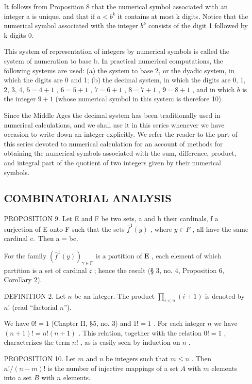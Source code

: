 It follows from Proposition 8 that the numerical symbol associated with an integer a is unique, and that if \(a < b^{k}\) it contains at most k digits. Notice that the numerical symbol associated with the integer \(b^{k}\) consists of the digit 1 followed by k digits 0.

This system of representation of integers by numerical symbols is called the system of numeration to base b. In practical numerical computations, the following systems are used: (a) the system to base 2, or the dyadic system, in which the digits are 0 and 1; (b) the decimal system, in which the digits are 0, 1, 2, 3, 4, \(5 = 4 + 1\) , \(6 = 5 + 1\) , \(7 = 6 + 1\) , \(8 = 7 + 1\) , \(9 = 8 + 1\) , and in which \(b\) is the integer \(9 + 1\) (whose numerical symbol in this system is therefore 10).

Since the Middle Ages the decimal system has been traditionally used in numerical calculations, and we shall use it in this series whenever we have occasion to write down an integer explicitly. We refer the reader to the part of this series devoted to numerical calculation for an account of methods for obtaining the numerical symbols associated with the sum, difference, product, and integral part of the quotient of two integers given by their numerical symbols.

\subsection{COMBINATORIAL ANALYSIS}

PROPOSITION 9. Let E and F be two sets, a and b their cardinals, f a surjection of E onto F such that the sets \(\overline{f}^{1}(y)\) , where \(y \in F\) , all have the same cardinal c.~Then a = bc.

For the family \((\bar{f}^1 (y))_{\gamma \in \mathbb{F}}\) is a partition of \(\mathbf{E}\) , each element of which partition is a set of cardinal \(\mathfrak{c}\) ; hence the result (§ 3, no. 4, Proposition 6, Corollary 2).

DEFINITION 2. Let \(n\) be an integer. The product \(\prod_{i < n} (i + 1)\) is denoted by \(n!\) (read ``factorial \(n\)'').

We have \(0! = 1\) (Chapter II, §5, no. 3) and \(1! = 1\) . For each integer \(n\) we have \((n + 1)! = n!(n + 1)\) . This relation, together with the relation \(0! = 1\) , characterizes the term \(n!\) , as is easily seen by induction on \(n\) .

PROPOSITION 10. Let \(m\) and \(n\) be integers such that \(m \leqslant n\) . Then \(n! / (n - m)!\) is the number of injective mappings of a set \(A\) with \(m\) elements into a set \(B\) with \(n\) elements.

